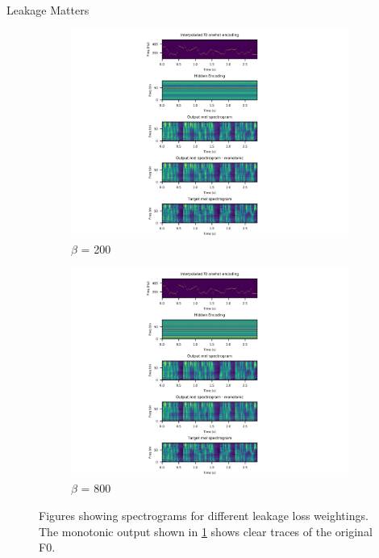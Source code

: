 \documentclass[10pt]{beamer}
\begin{document}
\begin{frame}{Leakage Matters}
    \begin{figure}[h]
  \begin{subfigure}[b]{0.28\textwidth}
    \includegraphics[width=\textwidth,trim={3.8cm 0 4.8cm 0},clip]{figures/beta-100-spects_step-12750-0y0939.png}
    \caption{$\beta$ = 200}
    \label{fig:1beet}
  \end{subfigure}
  \begin{subfigure}[b]{0.28\textwidth}
    \includegraphics[width=\textwidth,trim={3.8cm 0 4.8cm 0},clip]{figures/beta-800-spects_step-12900-0y1095.png}
    \caption{$\beta$ = 800}
    \label{fig:2}
  \end{subfigure}
  \caption{Figures showing spectrograms for different leakage loss weightings. The monotonic output shown in \ref{fig:1beet} shows clear traces of the original F0.}
  \label{fig:beta-spects}
\end{figure}

\end{frame}
\end{document}

